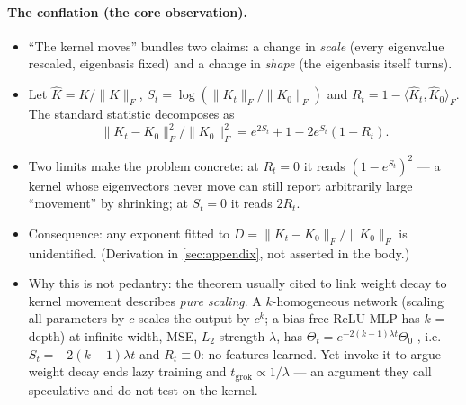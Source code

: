 \documentclass[a4paper,11pt]{article} %
\newcommand{\Kh}{\widehat{K}}
\newcommand{\Fnorm}[1]{\lVert #1 \rVert_F}
\newcommand{\tgrok}{t_{\mathrm{grok}}}
\begin{document}
\paragraph{The conflation (the core observation).}
\begin{itemize}
	\item ``The kernel moves'' bundles two claims: a change in \emph{scale}
		(every eigenvalue rescaled, eigenbasis fixed) and a change in \emph{shape}
		(the eigenbasis itself turns).
	\item Let $\Kh=K/\Fnorm{K}$, $S_t=\log(\Fnorm{K_t}/\Fnorm{K_0})$ and
		$R_t=1-\langle\Kh_t,\Kh_0\rangle_F$. The standard statistic decomposes as
		\begin{equation}
			\Fnorm{K_t-K_0}^2\big/\Fnorm{K_0}^2 = e^{2S_t}+1-2e^{S_t}(1-R_t).
			\label{eq:decomp}
		\end{equation}
	\item Two limits make the problem concrete: at $R_t=0$ it reads
		$(1-e^{S_t})^2$ --- a kernel whose eigenvectors never move can still report
		arbitrarily large ``movement'' by shrinking; at $S_t=0$ it reads $2R_t$.
	\item Consequence: any exponent fitted to $D=\Fnorm{K_t-K_0}/\Fnorm{K_0}$ is
		unidentified. (Derivation in \cref{sec:appendix}, not asserted in the body.)
	\item Why this is not pedantry: the theorem usually cited to link weight decay
		to kernel movement describes \emph{pure scaling}. A $k$-homogeneous network
		(scaling all parameters by $c$ scales the output by $c^k$; a bias-free ReLU
		MLP has $k$ = depth) at infinite width, MSE, $L_2$ strength $\lambda$, has
		$\Theta_t=e^{-2(k-1)\lambda t}\Theta_0$
		\citep[Thms.~1--2]{lewkowycz2020l2}, i.e. $S_t=-2(k-1)\lambda t$ and
		$R_t\equiv0$: no features learned. Yet
		\citet[App.~13, arXiv v3]{kumar2024grokking} invoke it to argue weight decay
		ends lazy training and $\tgrok\propto1/\lambda$ --- an argument they call
		speculative and do not test on the kernel.
\end{itemize}
\end{document}
